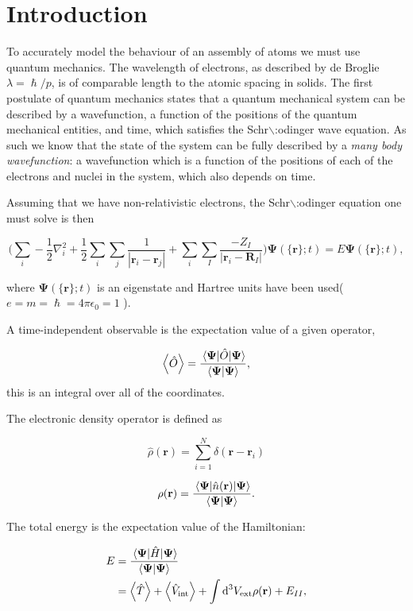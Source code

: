 \documentclass[a4paper,12pt,oneside,print,numbered,index,PageStyleIII]{PhDThesisPSnPDF}
\begin{document}
\section{Introduction}
\label{sec:org1f19249}

To accurately model the behaviour of an assembly of atoms we must use quantum mechanics. The
wavelength of electrons, as described by de Broglie \(\lambda = \hslash/p\), is of comparable length
to the atomic spacing in solids. The first postulate of quantum mechanics states that a quantum
mechanical system can be described by a wavefunction, a function of the positions of the quantum
mechanical entities, and time, which satisfies the Schr$\backslash$:odinger wave equation. As such we know that
the state of the system can be fully described by a \emph{many body wavefunction}: a wavefunction which
is a function of the positions of each of the electrons and nuclei in the system, which also depends
on time.

Assuming that we have non-relativistic electrons, the Schr$\backslash$:odinger equation one must solve is then

  \begin{equation}
    \Big( \sum_{i} - \frac{1}{2} \nabla_{i}^{2} + \frac{1}{2} \sum_i \sum_j    \frac{1}{|
\mathbf{r}_i - \mathbf{r}_j |}+ \sum_i \sum_I \frac{-Z_I}{| \mathbf{r}_i - \mathbf{R}_I |} \Big)
\mathbf{ \Psi }(\{\mathbf{r}\}; t) = E \mathbf{ \Psi }(\{\mathbf{r}\}; t),
    \label{eq:non_rel_schodinger}
  \end{equation}

where \(\mathbf{ \Psi }(\{\mathbf{r}\}; t)\) is an eigenstate and Hartree units have been used( \(e = m = \hslash = 4\pi\epsilon_0 = 1\) ).

A time-independent observable is the expectation value of a given operator,

\[ \expval{\hat{O}} = \frac{\expval{\hat{O}}{\mathbf{ \Psi }} }{ \bra{\mathbf{ \Psi}}\ket{\mathbf{ \Psi }} }, \]
this is an integral over all of the coordinates.

The electronic density operator is defined as

\[ \hat{\rho}(\mathbf{r}) = \sum_{i=1}^{N} \delta ( \mathbf{r} - \mathbf{r}_{i} ) \]

\[ \rho(\mathbf{r}) = \frac{\expval{\hat{n}(\mathbf{r})}{\mathbf{ \Psi }} }{ \bra{\mathbf{\Psi}}\ket{\mathbf{ \Psi }} }. \]

The total energy is the expectation value of the Hamiltonian:

\begin{align}
 E &= \frac{\expval{\hat{H}}{\mathbf{ \Psi }} }{ \bra{\mathbf{\Psi}}\ket{\mathbf{ \Psi }}}\\
   &= \expval{\hat{T}} + \expval{\hat{V}_{\text{int}}} + \int \text{d}^3 V_{\text{ext}} \rho(\mathbf{r}) + E_{II},
\label{eq:totalenergy}
\end{align}
\end{document}
